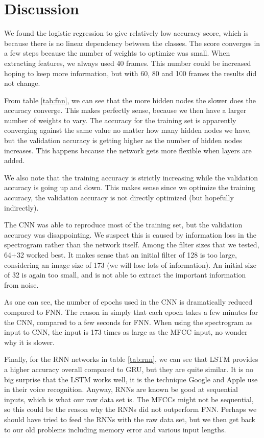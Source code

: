 \section{Discussion} \label{sec:discussion}
We found the logistic regression to give relatively low accuracy score, which is because there is no linear dependency between the classes. The score converges in a few steps because the number of weights to optimize was small. When extracting features, we always used 40 frames. This number could be increased hoping to keep more information, but with 60, 80 and 100 frames the results did not change. 

From table \eqref{tab:fnn}, we can see that the more hidden nodes the slower does the accuracy converge. This makes perfectly sense, because we then have a larger number of weights to vary. The accuracy for the training set is apparently converging against the same value no matter how many hidden nodes we have, but the validation accuracy is getting higher as the number of hidden nodes increases. This happens because the network gets more flexible when layers are added. 

We also note that the training accuracy is strictly increasing while the validation accuracy is going up and down. This makes sense since we optimize the training accuracy, the validation accuracy is not directly optimized (but hopefully indirectly). 

The CNN was able to reproduce most of the training set, but the validation accuracy was disappointing. We suspect this is caused by information loss in the spectrogram rather than the network itself. Among the filter sizes that we tested, 64+32 worked best. It makes sense that an initial filter of 128 is too large, considering an image size of 173 (we will lose lots of information). An initial size of 32 is again too small, and is not able to extract the important information from noise. 

As one can see, the number of epochs used in the CNN is dramatically reduced compared to FNN. The reason in simply that each epoch takes a few minutes for the CNN, compared to a few seconds for FNN. When using the spectrogram as input to CNN, the input is 173 times as large as the MFCC input, no wonder why it is slower. 

Finally, for the RNN networks in table \eqref{tab:rnn}, we can see that LSTM provides a higher accuracy overall compared to GRU, but they are quite similar. It is no big surprise that the LSTM works well, it is the technique Google and Apple use in their voice recognition. Anyway, RNNs are known be good at sequential inputs, which is what our raw data set is. The MFCCs might not be sequential, so this could be the reason why the RNNs did not outperform FNN. Perhaps we should have tried to feed the RNNs with the raw data set, but we then get back to our old problems including memory error and various input lengths. 

